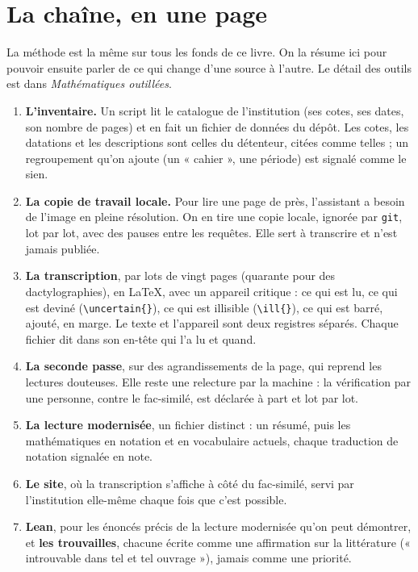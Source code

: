 \chapter{La chaîne, en une page}\label{ch:chaine}

La méthode est la même sur tous les fonds de ce livre. On la résume ici pour pouvoir
ensuite parler de ce qui change d'une source à l'autre. Le détail des outils est dans
\emph{Mathématiques outillées}.



\begin{enumerate}
  \item \textbf{L'inventaire.} Un script lit le catalogue de l'institution (ses cotes, ses
        dates, son nombre de pages) et en fait un fichier de données du dépôt. Les cotes,
        les datations et les descriptions sont celles du détenteur, citées comme telles ; un
        regroupement qu'on ajoute (un « cahier », une période) est signalé comme le sien.
  \item \textbf{La copie de travail locale.} Pour lire une page de près, l'assistant a
        besoin de l'image en pleine résolution. On en tire une copie locale, ignorée par
        \texttt{git}, lot par lot, avec des pauses entre les requêtes. Elle sert à
        transcrire et n'est jamais publiée.
  \item \textbf{La transcription}, par lots de vingt pages (quarante pour des
        dactylographies), en LaTeX, avec un appareil critique : ce qui est lu, ce qui est
        deviné (\verb|\uncertain{}|), ce qui est illisible (\verb|\ill{}|), ce qui est
        barré, ajouté, en marge. Le texte et l'appareil sont deux registres séparés.
        Chaque fichier dit dans son en-tête qui l'a lu et quand.
  \item \textbf{La seconde passe}, sur des agrandissements de la page, qui reprend les
        lectures douteuses. Elle reste une relecture par la machine : la vérification par
        une personne, contre le fac-similé, est déclarée à part et lot par lot.
  \item \textbf{La lecture modernisée}, un fichier distinct : un résumé, puis les
        mathématiques en notation et en vocabulaire actuels, chaque traduction de notation
        signalée en note.
  \item \textbf{Le site}, où la transcription s'affiche à côté du fac-similé, servi par
        l'institution elle-même chaque fois que c'est possible.
  \item \textbf{Lean}, pour les énoncés précis de la lecture modernisée qu'on peut
        démontrer, et \textbf{les trouvailles}, chacune écrite comme une affirmation sur
        la littérature (« introuvable dans tel et tel ouvrage »), jamais comme une
        priorité.
\end{enumerate}

